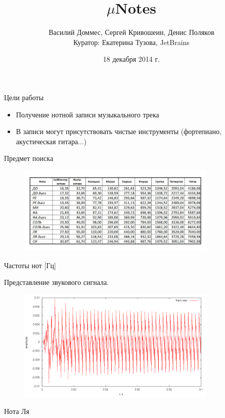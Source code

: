 \documentclass[11pt,slides,aspectratio=43]{beamer}%
\title{$\mu$Notes}
\author[]{Василий Доммес, Сергей Кривошеин, Денис Поляков
	\\ Куратор: Екатерина Тузова, JetBrains}
\date{18 декабря 2014 г.}
\begin{document}
	\begin{frame}
		\maketitle
	\end{frame}

    \begin{frame}{Цели работы}
		\begin{itemize}
            \item Получение нотной записи музыкального трека
            \item В записи могут присутствовать чистые инструменты (фортепиано, акустическая гитара...)
        \end{itemize}
	\end{frame}

    \begin{frame}{Предмет поиска}
        \begin{figure}[h!]
            \begin{center}
                \includegraphics[width = 0.85\textwidth]{notes.jpg}
            \end{center}
        \end{figure}
        \begin{center}
           Частоты нот [Гц]
        \end{center}
    \end{frame}

    \begin{frame}{Представление звукового сигнала.}
        \begin{figure}[h!]
            \begin{center}
                \includegraphics[width = 0.85\textwidth]{series.png}
            \end{center}
        \end{figure}
        \begin{center}
           Нота Ля
        \end{center}
    \end{frame}
\end{document}
